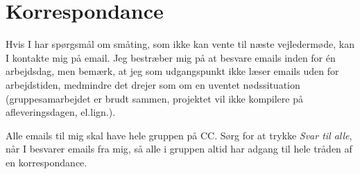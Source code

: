\documentclass[12pt,oneside,final]{article}
\begin{document}
\section{Korrespondance}
Hvis I har spørgsmål om småting, som ikke kan vente til næste vejledermøde, kan I kontakte mig på email.
Jeg bestræber mig på at besvare emails inden for \'en arbejdsdag, men bemærk, at jeg som udgangspunkt ikke læser emails uden for arbejdstiden, medmindre det drejer som om en uventet nødssituation (gruppesamarbejdet er brudt sammen, projektet vil ikke kompilere på afleveringsdagen, el.lign.).

Alle emails til mig skal have hele gruppen på CC.
Sørg for at trykke \emph{Svar til alle}, når I besvarer emails fra mig, så alle i gruppen altid har adgang til
hele tråden af en korrespondance.
\end{document}
